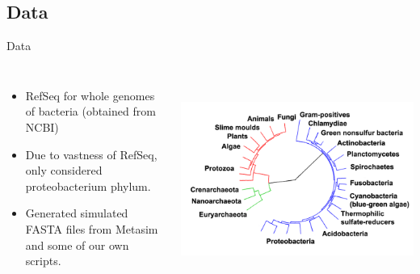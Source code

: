 \documentclass[xcolor=x11names,compress]{beamer}
\renewcommand{\(}{\begin{columns}}
\renewcommand{\)}{\end{columns}}
\newcommand{\<}[1]{\begin{column}{#1}}
\renewcommand{\>}{\end{column}}
\begin{document}
\subsection{Data}
\begin{frame}{Data}
\begin{columns}[c] %

\begin{itemize}\itemsep1em
\item RefSeq for whole genomes of bacteria (obtained from NCBI)
\item Due to vastness of RefSeq, only considered proteobacterium phylum.
\item Generated simulated FASTA files from Metasim and some of our own scripts.
\end{itemize}

         \includegraphics[width=1\textwidth, height=1\textwidth]{phylogeny.png}\\
\end{columns}

\end{frame}
\end{document}
